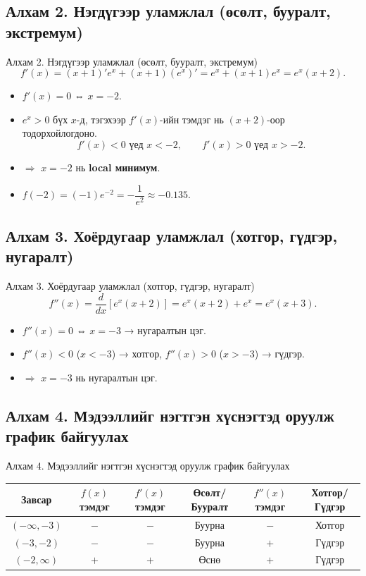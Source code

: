\subsection*{Алхам 2. Нэгдүгээр уламжлал (өсөлт, бууралт, экстремум)}
\begin{frame}[allowframebreaks]{Алхам 2. Нэгдүгээр уламжлал (өсөлт, бууралт, экстремум)}
\[
f'(x) = (x+1)'e^x + (x+1)(e^x)' = e^x + (x+1)e^x = e^x(x+2).
\]
\begin{itemize}
  \item $f'(x)=0$ ⇔ $x=-2$.
  \item $e^x>0$ бүх $x$-д, тэгэхээр $f'(x)$-ийн тэмдэг нь $(x+2)$-оор тодорхойлогдоно.
  \[
  f'(x)<0 \text{  үед } x<-2, \qquad f'(x)>0 \text{  үед } x>-2.
  \]
  \item $\Rightarrow$ $x=-2$ нь \textbf{local минимум}.
  \item $f(-2)=(-1)e^{-2}=-\dfrac{1}{e^2}\approx -0.135$.
\end{itemize}
\end{frame}

\subsection*{Алхам 3. Хоёрдугаар уламжлал (хотгор, гүдгэр, нугаралт)}
\begin{frame}[allowframebreaks]{Алхам 3. Хоёрдугаар уламжлал (хотгор, гүдгэр, нугаралт)}
\[
f''(x) = \frac{d}{dx}[e^x(x+2)] = e^x(x+2)+e^x=e^x(x+3).
\]
\begin{itemize}
  \item $f''(x)=0$ ⇔ $x=-3$ → нугаралтын цэг.
  \item $f''(x)<0$ ($x<-3$) → хотгор, $f''(x)>0$ ($x>-3$) → гүдгэр.
  \item $\Rightarrow$ $x=-3$ нь нугаралтын цэг.
\end{itemize}
\end{frame}

\subsection*{Алхам 4. Мэдээллийг нэгтгэн хүснэгтэд оруулж график байгуулах}
\begin{frame}[allowframebreaks]{Алхам 4. Мэдээллийг нэгтгэн хүснэгтэд оруулж график байгуулах}
\begin{center}
\renewcommand{\arraystretch}{1.3}
\begin{fitbox}\begin{tabular}{|c|c|c|c|c|c|}
\hline
Завсар & $f(x)$ тэмдэг & $f'(x)$ тэмдэг & Өсөлт/Бууралт & $f''(x)$ тэмдэг & Хотгор/Гүдгэр \\
\hline
$(-\infty,-3)$ & $-$ & $-$ & Буурна & $-$ & Хотгор \\
\hline
$(-3,-2)$ & $-$ & $-$ & Буурна & $+$ & Гүдгэр \\
\hline
$(-2,\infty)$ & $+$ & $+$ & Өснө & $+$ & Гүдгэр \\
\hline
\end{tabular}\end{fitbox}
\end{center}
\end{frame}


